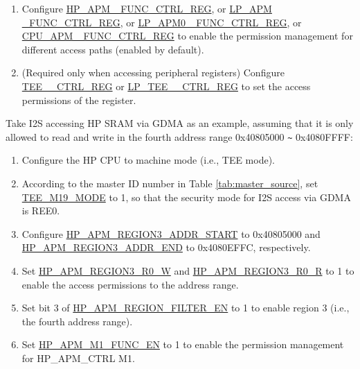 \documentclass[main\_\_EN.tex]{subfiles}
\begin{document}
\begin{enumerate}
    \item Configure \hyperref[regdesc:HPAPMFUNCCTRLREG]{HP\_APM\_ FUNC\_CTRL\_REG}, or \hyperref[regdesc:LPAPMFUNCCTRLREG]{LP\_APM \_FUNC\_CTRL\_REG}, or \hyperref[regdesc:LPAPM0FUNCCTRLREG]{LP\_APM0 \_FUNC\_CTRL\_REG}, or \hyperref[regdesc:CPUAPMFUNCCTRLREG]{CPU\_APM \_FUNC\_CTRL\_REG} to enable the permission management for different access paths (enabled by default).

    \item (Required only when accessing peripheral registers) Configure \hyperref[regdesc:TEEPERICTRLREG]{TEE\_\_CTRL\_REG} or \hyperref[regdesc:LPTEEPERICTRLREG]{LP\_TEE\_\_CTRL\_REG} to set the access permissions of the  register.

\end{enumerate}

Take I2S accessing HP SRAM via GDMA as an example, assuming that it is only allowed to read and write in the fourth address range 0x40805000 \verb+~+ 0x4080FFFF:

\begin{enumerate}

    \item Configure the HP CPU to machine mode (i.e., TEE mode).

    \item According to the master ID number in Table \ref{tab:master_source}, set \hyperref[fielddesc:TEEMNMODE]{TEE\_M19\_MODE} to 1, so that the security mode for I2S access via GDMA is REE0.

    \item Configure \hyperref[regdesc:HPAPMREGIONNADDRSTARTREG]{HP\_APM\_REGION3\_ADDR\_START} to 0x40805000 and \hyperref[regdesc:HPAPMREGIONNADDRSTARTREG]{HP\_APM\_REGION3\_ADDR\_END} to 0x4080EFFC, respectively.

    \item Set \hyperref[fielddesc:HPAPMREGIONNR0W]{HP\_APM\_REGION3\_R0\_W} and \hyperref[fielddesc:HPAPMREGIONNR0R]{HP\_APM\_REGION3\_R0\_R} to 1 to enable the access permissions to the address range.

    \item Set bit 3 of \hyperref[fielddesc:HPAPMREGIONFILTEREN]{HP\_APM\_REGION\_FILTER\_EN} to 1 to enable region 3 (i.e., the fourth address range).

    \item Set \hyperref[fielddesc:HPAPMM1FUNCEN]{HP\_APM\_M1\_FUNC\_EN} to 1 to enable the permission management for HP\_APM\_CTRL M1.

\end{enumerate}
\end{document}
